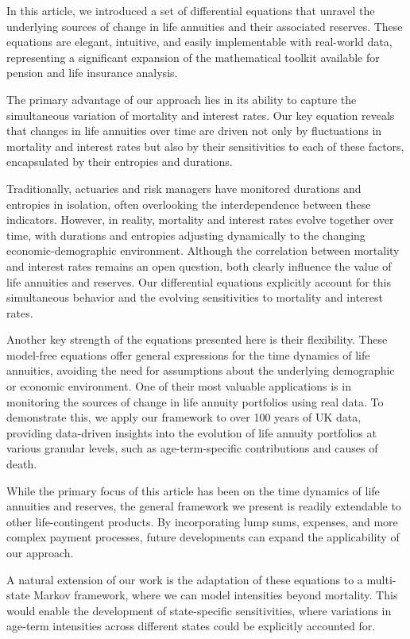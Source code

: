 \documentclass[12pt]{article}
\begin{document}
In this article, we introduced a set of differential equations that unravel the underlying sources of change in life annuities and their associated reserves. These equations are elegant, intuitive, and easily implementable with real-world data, representing a significant expansion of the mathematical toolkit available for pension and life insurance analysis.

The primary advantage of our approach lies in its ability to capture the simultaneous variation of mortality and interest rates. Our key equation reveals that changes in life annuities over time are driven not only by fluctuations in mortality and interest rates but also by their sensitivities to each of these factors, encapsulated by their entropies and durations.

Traditionally, actuaries and risk managers have monitored durations and entropies in isolation, often overlooking the interdependence between these indicators. However, in reality, mortality and interest rates evolve together over time, with durations and entropies adjusting dynamically to the changing economic-demographic environment. Although the correlation between mortality and interest rates remains an open question, both clearly influence the value of life annuities and reserves. Our differential equations explicitly account for this simultaneous behavior and the evolving sensitivities to mortality and interest rates.

Another key strength of the equations presented here is their flexibility. These model-free equations offer general expressions for the time dynamics of life annuities, avoiding the need for assumptions about the underlying demographic or economic environment. One of their most valuable applications is in monitoring the sources of change in life annuity portfolios using real data. To demonstrate this, we apply our framework to over 100 years of UK data, providing data-driven insights into the evolution of life annuity portfolios at various granular levels, such as age-term-specific contributions and causes of death.

While the primary focus of this article has been on the time dynamics of life annuities and reserves, the general framework we present is readily extendable to other life-contingent products. By incorporating lump sums, expenses, and more complex payment processes, future developments can expand the applicability of our approach.

A natural extension of our work is the adaptation of these equations to a multi-state Markov framework, where we can model intensities beyond mortality. This would enable the development of state-specific sensitivities, where variations in age-term intensities across different states could be explicitly accounted for.
\end{document}
